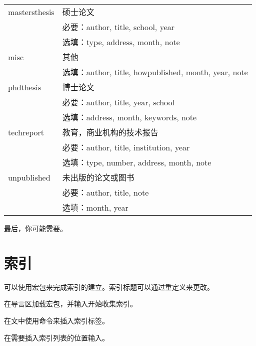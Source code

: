 \begin{table}[!htb]
\begin{tabular}{>{\ttfamily}ll}
\hline
mastersthesis & 硕士论文\\
& 必要：author, title, school, year \\
& 选填：type, address, month, note\\
\hline
misc & 其他 \\
& 选填：author, title, howpublished, month, year, note \\
\hline
phdthesis & 博士论文 \\
& 必要：author, title, year, school\\
& 选填：address, month, keywords, note\\
\hline
techreport & 教育，商业机构的技术报告\\
& 必要：author, title, institution, year\\
& 选填：type, number, address, month, note\\
\hline
unpublished & 未出版的论文或图书\\
& 必要：author, title, note\\
& 选填：month, year\\
\hline
\end{tabular}
\end{table}

最后，你可能需要。

\section{索引}
可以使用宏包来完成索引的建立。索引标题可以通过重定义来更改。
\begin{feae}
\item 在导言区加载宏包，并输入开始收集索引。
\item 在文中使用命令来插入索引标签。
\item 在需要插入索引列表的位置输入。
\end{feae}

